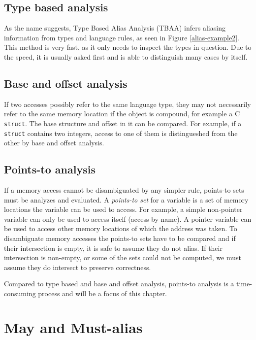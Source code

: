 \subsection{Type based analysis}

As the name suggests, Type Based Alias Analysis (TBAA) infers aliasing
information from types and language rules, as seen in Figure
\ref{alias-example2}. This method is very fast, as it only needs to inspect
the types in question. Due to the speed, it is usually asked first and is able
to distinguish many cases by itself.

\subsection{Base and offset analysis}

If two accesses possibly refer to the same language type, they may not
necessarily refer to the same memory location if the object is compound, for
example a C {\tt struct}. The base structure and offset in it can be compared.
For example, if a {\tt struct} contains two integers, access to one of them is
distingueshed from the other by base and offset analysis.

\subsection{Points-to analysis}

If a memory access cannot be disambiguated by any simpler rule, points-to sets
must be analyzes and evaluated. A {\it points-to set} for a variable is a set of
memory locations the variable can be used to access. For example, a simple
non-pointer variable can only be used to access itself (access by name). A
pointer variable can be used to access other memory locations of which the
address was taken. To disambiguate memory accesses the points-to sets have to be
compared and if their intersection is empty, it is safe to assume they do not
alias. If their intersection is non-empty, or some of the sets could not be
computed, we must assume they do intersect to preserve correctness.

Compared to type based and base and offset analysis, points-to analysis is a
time-consuming process and will be a focus of this chapter.

\section{May and Must-alias}

